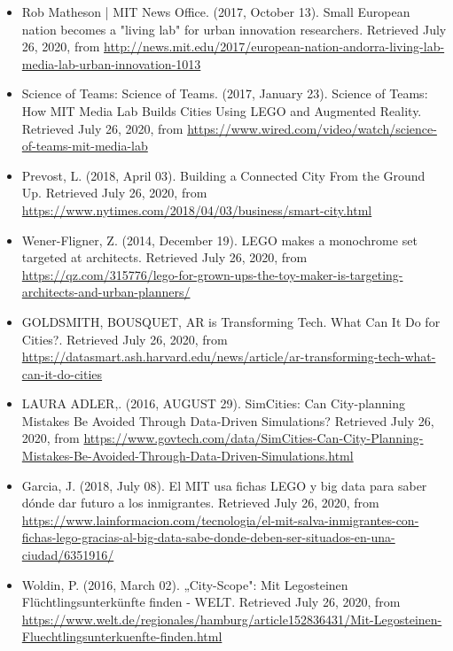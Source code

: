 {\begin{itemize}
            \item{
                        Rob Matheson | MIT News Office. (2017, October 13). Small European nation becomes a "living lab" for urban innovation researchers. Retrieved July 26, 2020, from \url{http://news.mit.edu/2017/european-nation-andorra-living-lab-media-lab-urban-innovation-1013}
                  }

            \item{
                        Science of Teams: Science of Teams. (2017, January 23). Science of Teams: How MIT Media Lab Builds Cities Using LEGO and Augmented Reality. Retrieved July 26, 2020, from \url{https://www.wired.com/video/watch/science-of-teams-mit-media-lab}
                  }

            \item{
                        Prevost, L. (2018, April 03). Building a Connected City From the Ground Up. Retrieved July 26, 2020, from \url{https://www.nytimes.com/2018/04/03/business/smart-city.html}
                  }

            \item{
                        Wener-Fligner, Z. (2014, December 19). LEGO makes a monochrome set targeted at architects. Retrieved July 26, 2020, from \url{https://qz.com/315776/lego-for-grown-ups-the-toy-maker-is-targeting-architects-and-urban-planners/}
                  }

            \item{
                        GOLDSMITH, BOUSQUET, AR is Transforming Tech. What Can It Do for Cities?. Retrieved July 26, 2020, from \url{https://datasmart.ash.harvard.edu/news/article/ar-transforming-tech-what-can-it-do-cities}
                  }

            \item{
                        LAURA ADLER,. (2016, AUGUST 29). SimCities: Can City-planning Mistakes Be Avoided Through Data-Driven Simulations? Retrieved July 26, 2020, from \url{https://www.govtech.com/data/SimCities-Can-City-Planning-Mistakes-Be-Avoided-Through-Data-Driven-Simulations.html}
                  }

            \item{
                        Garcia, J. (2018, July 08). El MIT usa fichas LEGO y big data para saber dónde dar futuro a los inmigrantes. Retrieved July 26, 2020, from \url{https://www.lainformacion.com/tecnologia/el-mit-salva-inmigrantes-con-fichas-lego-gracias-al-big-data-sabe-donde-deben-ser-situados-en-una-ciudad/6351916/}
                  }

            \item{
                        Woldin, P. (2016, March 02). „City-Scope": Mit Legosteinen Flüchtlingsunterkünfte finden - WELT. Retrieved July 26, 2020, from \url{https://www.welt.de/regionales/hamburg/article152836431/Mit-Legosteinen-Fluechtlingsunterkuenfte-finden.html}
                  }

      \end{itemize}
}
